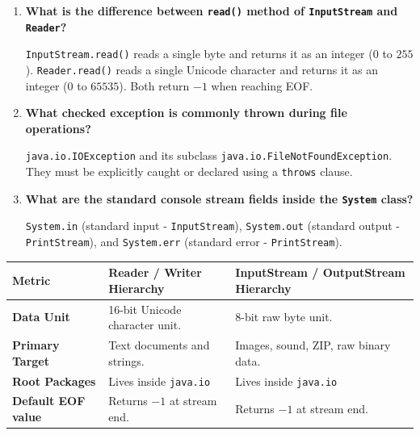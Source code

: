 \documentclass[12pt,a4paper]{article}
\newcommand{\Q}[1]{\textbf{#1}\par\noindent\ignorespaces}
\renewcommand{\arraystretch}{1.45}
\begin{document}
\begin{tcolorbox}[exambox, title={\textbf{Frequently Asked / Viva Questions}}]
\begin{enumerate}[leftmargin=*, label=\textbf{Q\arabic*.}, itemsep=5pt]
  \item \Q{What is the difference between \texttt{read()} method of \texttt{InputStream} and \texttt{Reader}?}
        \texttt{InputStream.read()} reads a single byte and returns it as an integer ($0$ to $255$). \texttt{Reader.read()} reads a single Unicode character and returns it as an integer ($0$ to $65535$). Both return $-1$ when reaching EOF.
        
  \item \Q{What checked exception is commonly thrown during file operations?}
        \texttt{java.io.IOException} and its subclass \texttt{java.io.FileNotFoundException}. They must be explicitly caught or declared using a \texttt{throws} clause.
        
  \item \Q{What are the standard console stream fields inside the \texttt{System} class?}
        \texttt{System.in} (standard input - \texttt{InputStream}), \texttt{System.out} (standard output - \texttt{PrintStream}), and \texttt{System.err} (standard error - \texttt{PrintStream}).
\end{enumerate}
\end{tcolorbox}

\begin{tcolorbox}[tikzbox, title={Comparison: Reader/Writer vs. InputStream/OutputStream}]
\centering
{\renewcommand{\arraystretch}{1.45}%
\begin{tabularx}{\linewidth}{|B{3.2cm}|Y|Y|}
\hline
\textbf{Metric} & \textbf{Reader / Writer Hierarchy} & \textbf{InputStream / OutputStream Hierarchy} \\
\hline
\textbf{Data Unit} & 16-bit Unicode character unit. & 8-bit raw byte unit. \\
\hline
\textbf{Primary Target} & Text documents and strings. & Images, sound, ZIP, raw binary data. \\
\hline
\textbf{Root Packages} & Lives inside \texttt{java.io} & Lives inside \texttt{java.io} \\
\hline
\textbf{Default EOF value} & Returns $-1$ at stream end. & Returns $-1$ at stream end. \\
\hline
\end{tabularx}}
\end{tcolorbox}
\end{document}

